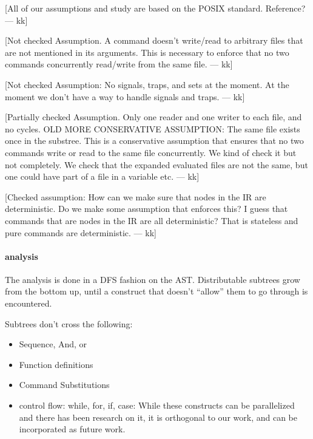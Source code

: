 \documentclass[sigplan,10pt,review,anonymous]{acmart}
\newcommand{\kk}[1]{[{\color{magenta}#1 --- kk}]}
\begin{document}

\kk{All of our assumptions and study are based on the POSIX
  standard. Reference?}

\kk{Not checked Assumption. A command doesn't write/read to arbitrary
  files that are not mentioned in its arguments. This is necessary to
  enforce that no two commands concurrently read/write from the same
  file.}

\kk{Not checked Assumption: No signals, traps, and sets at the
  moment. At the moment we don't have a way to handle signals and
  traps.}

\kk{Partially checked Assumption. Only one reader and one writer to
  each file, and no cycles. OLD MORE CONSERVATIVE ASSUMPTION: The same
  file exists once in the substree. This is a conservative assumption
  that ensures that no two commands write or read to the same file
  concurrently. We kind of check it but not completely. We check that
  the expanded evaluated files are not the same, but one could have
  part of a file in a variable etc.}

\kk{Checked assumption: How can we make sure that nodes in the IR are
  deterministic. Do we make some assumption that enforces this? I
  guess that commands that are nodes in the IR are all deterministic?
  That is stateless and pure commands are deterministic.}

\paragraph{analysis}

The analysis is done in a DFS fashion on the AST. Distributable
subtrees grow from the bottom up, until a construct that doesn't
``allow'' them to go through is encountered.


Subtrees don't cross the following:

\begin{itemize}
\item Sequence, And,  or
\item Function definitions
\item Command Substitutions
\item control flow: while, for, if, case: While these constructs can
  be parallelized and there has been research on it, it is orthogonal
  to our work, and can be incorporated as future work.
\end{itemize}
\end{document}
